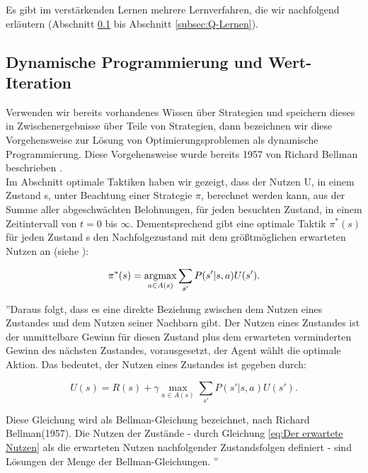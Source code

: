 Es gibt im verstärkenden Lernen mehrere Lernverfahren, die wir nachfolgend erläutern (Abschnitt \ref{subsec:Wert-Iteration} bis Abschnitt \ref{subsec:Q-Lernen}). \\

\subsection{Dynamische Programmierung und Wert-Iteration}
\label{subsec:Wert-Iteration}
Verwenden wir bereits vorhandenes Wissen über Strategien und speichern dieses in Zwischenergebnisse über Teile von Strategien, dann bezeichnen wir diese Vorgehensweise zur Lösung von Optimierungsproblemen als dynamische Programmierung. Diese Vorgehensweise wurde bereits 1957 von Richard Bellman beschrieben \cite[293]{Ertel}. \\

Im Abschnitt optimale Taktiken haben wir gezeigt, dass der Nutzen U, in einem Zustand s, unter Beachtung einer Strategie $\pi$, berechnet werden kann, aus der Summe aller abgeschwächten Belohnungen, für jeden besuchten Zustand, in einem Zeitintervall von $t = 0$ bis $\infty$. Dementsprechend gibt eine optimale Taktik $\pi^*(s)$ für jeden Zustand s den Nachfolgezustand mit dem größtmöglichen erwarteten Nutzen an (siehe \cite[759]{Russell}):

\begin{equation}
\pi^*(s) = \operatorname*{arg\!\max}_{a \in A(s)} \sum_{s'} P(s'|s, a) U(s').
\end{equation}

''Daraus folgt, dass es eine direkte Beziehung zwischen dem Nutzen eines Zustandes und dem Nutzen seiner Nachbarn gibt. Der Nutzen eines Zustandes ist der unmittelbare Gewinn für diesen Zustand plus dem erwarteten verminderten Gewinn des nächsten Zustandes, vorausgesetzt, der Agent wählt die optimale Aktion. Das bedeutet, der Nutzen eines Zustandes ist gegeben durch:

\begin{equation}
U(s) = R(s) + \gamma \max_{a \in A(s)} \sum_{s'} P(s'|s, a) U(s').
\end{equation}

Diese Gleichung wird als Bellman-Gleichung bezeichnet, nach Richard Bellman(1957). Die Nutzen der Zustände - durch Gleichung \ref{eq:Der erwartete Nutzen} als die erwarteten Nutzen nachfolgender Zustandsfolgen definiert - sind Lösungen der Menge der Bellman-Gleichungen. \cite[759]{Russell}''\\

